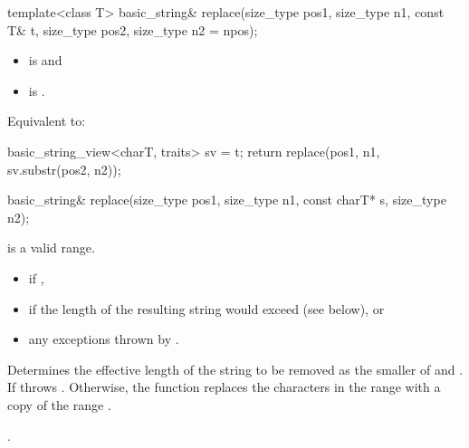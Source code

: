%
\begin{itemdecl}
template<class T>
  basic_string& replace(size_type pos1, size_type n1, const T& t,
                        size_type pos2, size_type n2 = npos);
\end{itemdecl}

\begin{itemdescr}
\pnum
\constraints
\begin{itemize}
\item
{} is
 and
\item
{} is
.
\end{itemize}

\pnum
\effects
Equivalent to:
\begin{codeblock}
basic_string_view<charT, traits> sv = t;
return replace(pos1, n1, sv.substr(pos2, n2));
\end{codeblock}
\end{itemdescr}

%
\begin{itemdecl}
basic_string& replace(size_type pos1, size_type n1, const charT* s, size_type n2);
\end{itemdecl}

\begin{itemdescr}
\pnum
\expects {} is a valid range.

\pnum
\throws
\begin{itemize}
\item {} if ,
\item {} if the length of the resulting string
would exceed  (see below), or
\item any exceptions thrown by .
\end{itemize}

\pnum
\effects Determines the effective length  of the string to be
removed as the smaller of  and . If
 throws . Otherwise,
the function replaces the characters in the range
with a copy of the range .

\pnum
\returns
{}.
\end{itemdescr}

